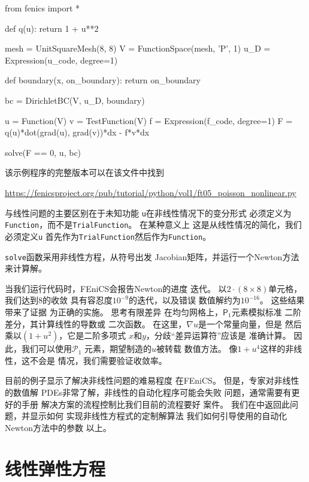 \begin{python}
from fenics import *

def q(u):
    return 1 + u**2

mesh = UnitSquareMesh(8, 8)
V = FunctionSpace(mesh, 'P', 1)
u_D = Expression(u_code, degree=1)

def boundary(x, on_boundary):
    return on_boundary

bc = DirichletBC(V, u_D, boundary)

u = Function(V)
v = TestFunction(V)
f = Expression(f_code, degree=1)
F = q(u)*dot(grad(u), grad(v))*dx - f*v*dx

solve(F == 0, u, bc)
\end{python}

该示例程序的完整版本可以在该文件中找到
\begin{center}
\url{https://fenicsproject.org/pub/tutorial/python/vol1/ft05_poisson_nonlinear.py}
\end{center}


与线性问题的主要区别在于未知功能
\texttt{u}在非线性情况下的变分形式
必须定义为\texttt{Function}，而不是\texttt{TrialFunction}。 在某种意义上
这是从线性情况的简化，我们必须定义\texttt{u}
首先作为\texttt{TrialFunction}然后作为\texttt{Function}。


\texttt{solve}函数采用非线性方程，从符号出发
Jacobian矩阵，并运行一个Newton方法来计算解。

当我们运行代码时，FEniCS会报告Newton的进度
迭代。 以$2\cdot(8\times 8)$单元格，我们达到8的收敛
具有容忍度$10^{-9}$的迭代，以及错误
数值解约为$10^{-16}$。 这些结果带来了证据
为正确的实施。 思考有限差异
在均匀网格上，$\mathsf{P}_1$元素模拟标准
二阶差分，其计算线性的导数或
二次函数。 在这里，$\nabla u$是一个常量向量，但是
然后乘以$(1+u^2)$，它是二阶多项式
$x$和$y$，分歧“差异运算符”应该是
准确计算。 因此，我们可以使用$\mathcal{P}_1$
元素，期望制造的$u$被转载
数值方法。 像$1+u^4$这样的非线性，这不会是
情况，我们需要验证收敛率。

目前的例子显示了解决非线性问题的难易程度
在FEniCS。 但是，专家对非线性的数值解
PDEs非常了解，非线性的自动化程序可能会失败
问题，通常需要有更好的手册
解决方案的流程控制比我们目前的流程要好
案件。 我们在\cite{ftut2}中返回此问题，并显示如何
实现非线性方程式的定制解算法
我们如何引导使用的自动化Newton方法中的参数
以上。

\section{线性弹性方程}
\label{ftut:elast}

